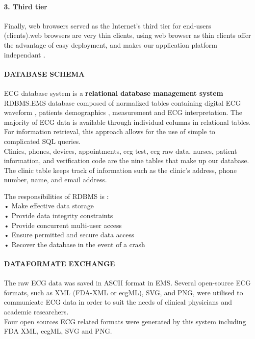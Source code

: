 \documentclass[12pt]{article}
\begin{document}
\paragraph{\textbf{3. Third tier}}
\paragraph{} Finally, web browsers served as the
Internet’s third tier for end-users (clients).web browsers are very thin clients, using web browser as thin clients offer the advantage of easy deployment, and makes our application platform independant .
\paragraph{\textbf{DATABASE SCHEMA }}
\paragraph{}ECG database system is a \textbf{relational database management system} RDBMS.EMS database composed of normalized tables containing digital ECG waveform , patients demographics , measurement and ECG interpretation. The majority of ECG data is available through individual columns in relational tables. For information retrieval, this approach allows for the use of simple to complicated SQL queries.\\Clinics, phones, devices, appointments, ecg test, ecg raw data, nurses, patient information, and verification code are the nine tables that make up our database.
The clinic table keeps track of information such as the clinic's address, phone number, name, and email address.

 The responsibilities of RDBMS is  : \\ • Make effective data storage\\ • Provide data integrity constraints\\ • Provide concurrent multi-user access\\ • Ensure permitted and secure data access\\ • Recover the database in the event of a crash
\paragraph{\textbf{DATAFORMATE EXCHANGE}}

\paragraph{} The raw ECG data was saved in ASCII format in EMS. Several open-source ECG formats, such as XML (FDA-XML or ecgML), SVG, and PNG, were utilised to communicate ECG data in order to suit the needs of clinical physicians and academic researchers.\\ Four open sources ECG related formats were generated by this system including FDA XML, ecgML, SVG and PNG.
\end{document}
